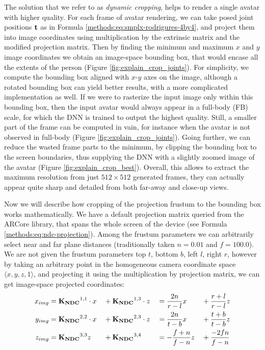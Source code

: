 The solution that we refer to as \textit{dynamic cropping}, helps to render a single avatar with higher quality. For each frame of avatar rendering, we can take posed joint positions $\bm{\mathrm{t}}$ as in Formula \ref{methods:eq:smplx-rodrigures-4by4}, and project them into image coordinates using multiplication by the extrinsic matrix and the modified projection matrix. Then by finding the minimum and maximum $x$ and $y$ image coordinates we obtain an image-space bounding box, that would encase all the extents of the person (Figure \ref{fig:explain_crop_joints}). For simplicity, we compute the bounding box aligned with $x$-$y$ axes on the image, although a rotated bounding box can yield better results, with a more complicated implementation as well. If we were to rasterize the input image only within this bounding box, then the input avatar would always appear in a full-body (FB) scale, for which the DNN is trained to output the highest quality. Still, a smaller part of the frame can be computed in vain, for instance when the avatar is not observed in full-body (Figure \ref{fig:explain_crop_joints}). Going further, we can reduce the wasted frame parts to the minimum, by clipping the bounding box to the screen boundaries, thus supplying the DNN with a slightly zoomed image of the avatar (Figure \ref{fig:explain_crop_best}). Overall, this allows to extract the maximum resolution from just $512 \times 512$ generated frames, they can actually appear quite sharp and detailed from both far-away and close-up views.

Now we will describe how cropping of the projection frustum to the bounding box works mathematically. We have a default projection matrix queried from the ARCore library, that spans the whole screen of the device (see Formula \ref{methods:eq:ndc-projection}). Among the frustum parameters we can arbitrarily select near and far plane distances (traditionally taken $n=0.01$ and $f=100.0$). We are not given the frustum parameters top $t$, bottom $b$, left $l$, right $r$, however by taking an arbitrary point in the homogeneous camera coordinate space $\langle x, y, z, 1 \rangle$, and projecting it using the multiplication by projection matrix, we can get image-space projected coordinates:
\begin{alignat}{4}
	x_{img} &= \bm{\mathrm{K_{NDC}}}^{1,1}\cdot x &&+ \bm{\mathrm{K_{NDC}}}^{1,3}\cdot z &&= \dfrac{2n}{r-l}x &&+ \dfrac{r + l}{r - l}z \label{methods:eq:project-coords-x}\\
	y_{img} &= \bm{\mathrm{K_{NDC}}}^{2,2}\cdot x &&+ \bm{\mathrm{K_{NDC}}}^{2,3}\cdot z &&= \dfrac{2n}{t-b}x &&+ \dfrac{t + b}{t - b}z  \label{methods:eq:project-coords-y}\\
	z_{img} &= \bm{\mathrm{K_{NDC}}}^{3,3}z &&+ \bm{\mathrm{K_{NDC}}}^{3,4} &&= -\dfrac{f + n}{f - n}z &&+ \dfrac{-2fn}{f - n} \label{methods:eq:project-coords-z}	
\end{alignat}

